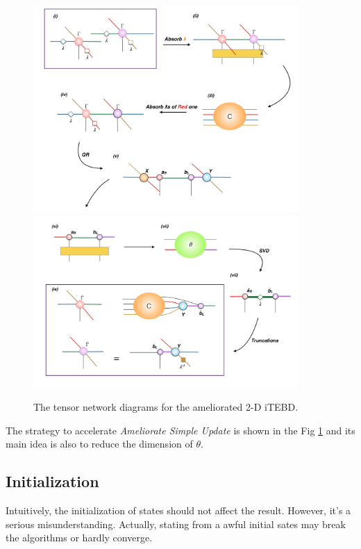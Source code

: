 \begin{figure}[ht]
	\centering
	\includegraphics[width=0.90\textwidth]{figures/fig319.png}
	\includegraphics[width=0.90\textwidth]{figures/fig320.png}
	\caption[The tensor network diagrams for the ameliorated 2-D iTEBD with QR decompositiont]{The tensor network diagrams for the ameliorated 2-D iTEBD.}
	\label{fig319}
\end{figure}

The strategy to accelerate \textit{Ameliorate Simple Update} is shown in the Fig \ref{fig319} and its main idea is also to reduce the dimension of $\theta$.


\subsection{Initialization}
\label{2doptInit}
Intuitively, the initialization of states should not affect the result. However, it's a serious misunderstanding. Actually, stating from a awful initial sates may break the algorithms or hardly converge.


